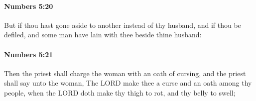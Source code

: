 		\paragraph{Numbers 5:20} %
			\label{NUMBERS-5-20}

			But if thou hast gone aside to another instead of thy husband, and if thou be defiled, and some man have lain with thee beside thine husband:


		\paragraph{Numbers 5:21} %
			\label{NUMBERS-5-21}

			Then the priest shall charge the woman with an oath of cursing, and the priest shall say unto the woman, The LORD make thee a curse and an oath among thy people, when the LORD doth make thy thigh to rot, and thy belly to swell;


